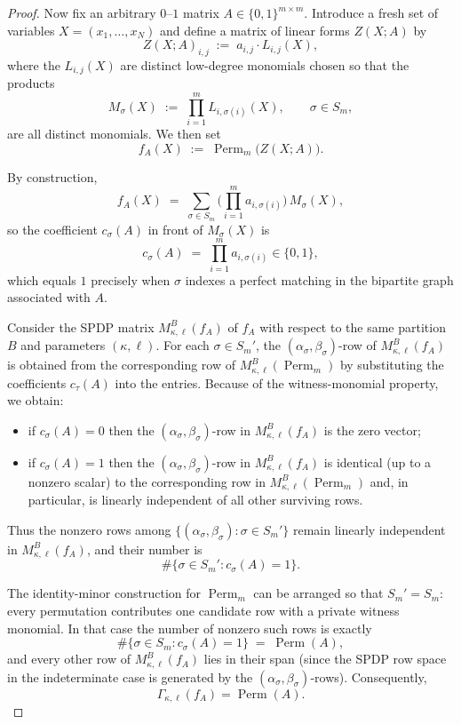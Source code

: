 \documentclass[12pt]{article}
\DeclareMathOperator{\Perm}{Perm}
\theoremstyle{definition}
\theoremstyle{definition}
\theoremstyle{remark}
\theoremstyle{remark}
\begin{document}
\begin{proof}
Now fix an arbitrary $0$--$1$ matrix $A \in \{0,1\}^{m\times m}$.
Introduce a fresh set of variables $X = (x_1,\dots,x_N)$ and define a matrix of
linear forms $Z(X;A)$ by
\[
  Z(X;A)_{i,j} \;:=\; a_{i,j} \cdot L_{i,j}(X),
\]
where the $L_{i,j}(X)$ are distinct low-degree monomials chosen so that the products
\[
  M_\sigma(X) \;:=\; \prod_{i=1}^m L_{i,\sigma(i)}(X), \qquad \sigma \in S_m,
\]
are all distinct monomials. We then set
\[
  f_A(X) \;:=\; \Perm_m\bigl(Z(X;A)\bigr).
\]

By construction,
\[
  f_A(X)
  \;=\;
  \sum_{\sigma \in S_m}
    \Big( \prod_{i=1}^m a_{i,\sigma(i)} \Big) \, M_\sigma(X),
\]
so the coefficient $c_\sigma(A)$ in front of $M_\sigma(X)$ is
\[
  c_\sigma(A)
  \;=\;
  \prod_{i=1}^m a_{i,\sigma(i)} \in \{0,1\},
\]
which equals $1$ precisely when $\sigma$ indexes a perfect matching in the bipartite
graph associated with $A$.

Consider the SPDP matrix $M^{B}_{\kappa,\ell}(f_A)$ of $f_A$ with respect to the same
partition $B$ and parameters $(\kappa,\ell)$. For each $\sigma \in S_m'$, the
$(\alpha_\sigma,\beta_\sigma)$-row of $M^{B}_{\kappa,\ell}(f_A)$ is obtained from the corresponding
row of $M^{B}_{\kappa,\ell}(\Perm_m)$ by substituting the coefficients $c_\tau(A)$ into the
entries. Because of the witness-monomial property, we obtain:
\begin{itemize}
\item if $c_\sigma(A) = 0$ then the $(\alpha_\sigma,\beta_\sigma)$-row in
  $M^{B}_{\kappa,\ell}(f_A)$ is the zero vector;
\item if $c_\sigma(A) = 1$ then the $(\alpha_\sigma,\beta_\sigma)$-row in
  $M^{B}_{\kappa,\ell}(f_A)$ is identical (up to a nonzero scalar) to the corresponding row in
  $M^{B}_{\kappa,\ell}(\Perm_m)$ and, in particular, is linearly independent of all other
  surviving rows.
\end{itemize}
Thus the nonzero rows among $\{(\alpha_\sigma,\beta_\sigma) : \sigma \in S_m'\}$ remain
linearly independent in $M^{B}_{\kappa,\ell}(f_A)$, and their number is
\[
  \#\{\sigma \in S_m' : c_\sigma(A) = 1\}.
\]

The identity-minor construction for $\Perm_m$ can be arranged so that $S_m' = S_m$:
every permutation contributes one candidate row with a private witness monomial.
In that case the number of nonzero such rows is exactly
\[
  \#\{\sigma \in S_m : c_\sigma(A) = 1\}
  \;=\;
  \Perm(A),
\]
and every other row of $M^{B}_{\kappa,\ell}(f_A)$ lies in their span (since the SPDP row space
in the indeterminate case is generated by the $(\alpha_\sigma,\beta_\sigma)$-rows).
Consequently,
\[
  \Gamma_{\kappa,\ell}(f_A) = \Perm(A).
\]


\end{proof}
\end{document}
